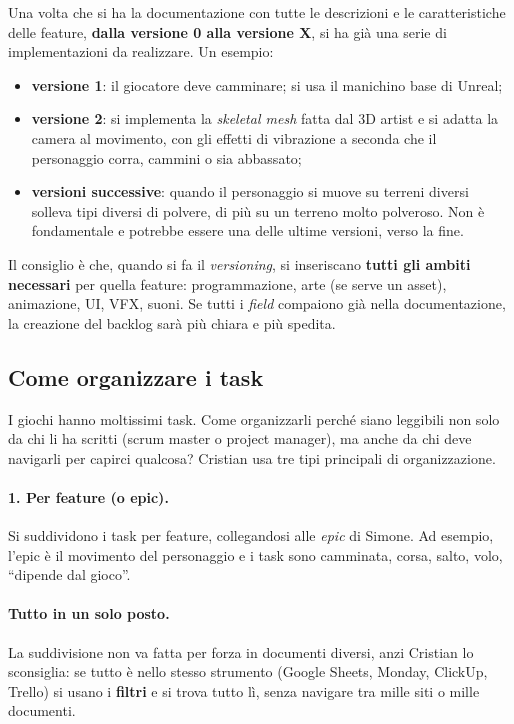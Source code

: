 Una volta che si ha la documentazione con tutte le descrizioni e le
caratteristiche delle feature, \textbf{dalla versione 0 alla versione X}, si
ha già una serie di implementazioni da realizzare. Un esempio:
\begin{itemize}
  \item \textbf{versione 1}: il giocatore deve camminare; si usa il
        manichino base di Unreal;
  \item \textbf{versione 2}: si implementa la \emph{skeletal mesh} fatta dal
        3D artist e si adatta la camera al movimento, con gli effetti di
        vibrazione a seconda che il personaggio corra, cammini o sia
        abbassato;
  \item \textbf{versioni successive}: quando il personaggio si muove su
        terreni diversi solleva tipi diversi di polvere, di più su un terreno
        molto polveroso. Non è fondamentale e potrebbe essere una delle
        ultime versioni, verso la fine.
\end{itemize}
Il consiglio è che, quando si fa il \emph{versioning}, si inseriscano
\textbf{tutti gli ambiti necessari} per quella feature: programmazione, arte
(se serve un asset), animazione, UI, VFX, suoni. Se tutti i \emph{field}
compaiono già nella documentazione, la creazione del backlog sarà più chiara
e più spedita.

\subsection{Come organizzare i task}

I giochi hanno moltissimi task. Come organizzarli perché siano leggibili non
solo da chi li ha scritti (scrum master o project manager), ma anche da chi
deve navigarli per capirci qualcosa? Cristian usa tre tipi principali di
organizzazione.

\paragraph{1. Per feature (o epic).} Si suddividono i task per feature,
collegandosi alle \emph{epic} di Simone. Ad esempio, l'epic è il movimento
del personaggio e i task sono camminata, corsa, salto, volo, ``dipende dal
gioco''.

\paragraph{Tutto in un solo posto.} La suddivisione non va fatta per forza in
documenti diversi, anzi Cristian lo sconsiglia: se tutto è nello stesso
strumento (Google Sheets, Monday, ClickUp, Trello) si usano i
\textbf{filtri} e si trova tutto lì, senza navigare tra mille siti o mille
documenti.

